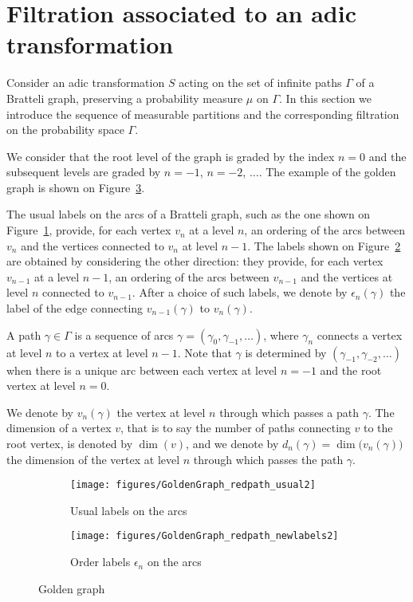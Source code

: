 \documentclass[12pt,a4paper]{article}
\begin{document}
\section{Filtration associated to an adic transformation} 

Consider an adic transformation $S$ acting on the set of infinite paths $\Gamma$ of a 
Bratteli graph, preserving a probability measure $\mu$ on $\Gamma$. 
In this section we introduce the sequence of measurable partitions 
and the corresponding filtration on the probability space $\Gamma$.

We consider that the root level of the graph is graded by the index 
$n=0$ and the subsequent levels are graded by $n=-1$, $n=-2$, $\ldots$. 
The example of the golden graph is shown on Figure~\ref{fig:goldengraph}. 

The usual labels on the arcs of a Bratteli graph, such as the one 
shown on Figure~\ref{fig:GoldenGraph}, provide, for each vertex $v_n$ 
at a level $n$, an ordering of the arcs between $v_n$ and the vertices connected 
to $v_n$ at level $n-1$.  
The labels shown on Figure~\ref{fig:GoldenGraph_newlabs}  
are obtained by considering the other direction: they provide, 
for each vertex $v_{n-1}$ at a level $n-1$, 
an ordering of the arcs between $v_{n-1}$ and the vertices at level $n$ connected 
to $v_{n-1}$. 
After a choice of such labels, we denote 
by $\boxed{\epsilon_n(\gamma)}$ the label of the edge connecting $v_{n-1}(\gamma)$ to 
$v_n(\gamma)$. 



A path $\gamma \in \Gamma$ is a sequence of arcs 
$\gamma=(\gamma_0, \gamma_{-1}, \ldots)$, where $\gamma_n$ connects 
a vertex at level $n$ to a vertex at level $n-1$. 
Note that $\gamma$ is determined by $(\gamma_{-1}, \gamma_{-2}, \ldots)$ 
when there is a unique arc between each vertex at level $n=-1$ and the root vertex 
at level $n=0$.  

We denote by $v_n(\gamma)$ the vertex at level $n$ through which passes a path $\gamma$. 
The dimension of a vertex $v$, that is to say the number of paths connecting $v$ 
to the root vertex, is denoted by $\dim(v)$, and we denote by 
$\boxed{d_n(\gamma)=\dim\bigl(v_n(\gamma)\bigr)}$ the dimension of the vertex at level $n$ 
through which passes the path $\gamma$. 


\begin{figure}[!h]
   \centering
   \begin{subfigure}[t]{0.37\textwidth}
   \centering
   	\texttt{[image: figures/GoldenGraph\_redpath\_usual2]}
 		\caption{\footnotesize Usual labels on the arcs}\label{fig:GoldenGraph}
    \end{subfigure}              
   \quad
    \begin{subfigure}[t]{0.37\textwidth}
    \centering
   	\texttt{[image: figures/GoldenGraph\_redpath\_newlabels2]}
 		\caption{\footnotesize Order labels $\epsilon_n$ on the arcs}\label{fig:GoldenGraph_newlabs}
 	\end{subfigure}      
   \caption{Golden graph}
   \label{fig:goldengraph}
 \end{figure}
\end{document}
